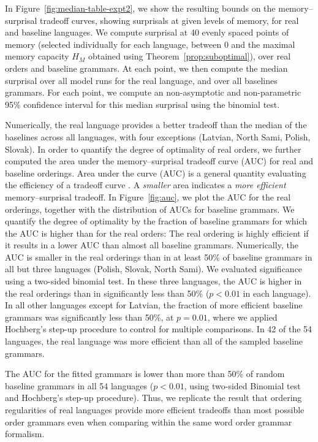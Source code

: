 In Figure~\ref{fig:median-table-expt2}, we show the resulting bounds on the memory--surprisal tradeoff curves, showing surprisals at given levels of memory, for real and baseline languages.
We compute surprisal at 40 evenly spaced points of memory (selected individually for each language, between 0 and the maximal memory capacity $H_M$ obtained using Theorem~\ref{prop:suboptimal}), over real orders and baseline grammars.
At each point, we then compute the median surprisal over all model runs for the real language, and over all baselines grammars.
For each point, we compute an non-asymptotic and non-parametric 95\% confidence interval for this median surprisal using the binomial test.

Numerically, the real language provides a better tradeoff than the median of the baselines across all languages, with four exceptions (Latvian, North Sami, Polish, Slovak). In order to quantify the degree of optimality of real orders, we further computed the area under the memory--surprisal tradeoff curve (AUC) for real and baseline orderings.
Area under the curve (AUC) is a general quantity evaluating the efficiency of a tradeoff curve \citep{bradley1997use}.
A \emph{smaller} area indicates a \emph{more efficient} memory--surprisal tradeoff.
In Figure~\ref{fig:auc}, we plot the AUC for the real orderings, together with the distribution of AUCs for baseline grammars.
We quantify the degree of optimality by the fraction of baseline grammars for which the AUC is higher than for the real orders:
The real ordering is highly efficient if it results in a lower AUC than almost all baseline grammars.
Numerically, the AUC is smaller in the real orderings than in at least 50\% of baseline grammars in all but three languages (Polish, Slovak, North Sami).
We evaluated significance using a two-sided binomial test.
In these three languages, the AUC is higher in the real orderings than in significantly less than 50\% ($p < 0.01$ in each language).
In all other languages except for Latvian, the fraction of more efficient baseline grammars was significantly less than 50\%, at $p=0.01$, where we applied Hochberg's step-up procedure \citep{hochberg1988sharper} to control for multiple comparisons.
In 42 of the 54 languages, the real language was more efficient than all of the sampled baseline grammars. %



The AUC for the fitted grammars is lower than more than 50\% of random baseline grammars in all 54 languages ($p < 0.01$, using two-sided Binomial test and Hochberg's step-up procedure). Thus, we replicate the result that ordering regularities of real languages provide more efficient tradeoffs than most possible order grammars even when comparing within the same word order grammar formalism.



